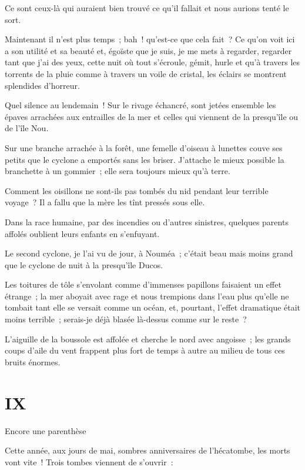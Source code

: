 \documentclass[french,twoside]{book} %
\newcommand\chapteropen{} %
\newcommand\chaptercont{} %
\newcommand\chapterclose{} %
\begin{document}
Ce sont ceux-là qui auraient bien trouvé ce qu’il fallait et nous aurions tenté le sort.\par
Maintenant il n’est plus temps ; bah ! qu’est-ce que cela fait ? Ce qu’on voit ici a son utilité et sa beauté et, égoïste que je suis, je me mets à regarder, regarder tant que j’ai des yeux, cette nuit où tout s’écroule, gémit, hurle et qu’à travers les torrents de la pluie comme à travers un  voile de cristal, les éclairs se montrent splendides d’horreur.\par
Quel silence au lendemain ! Sur le rivage échancré, sont jetées ensemble les épaves arrachées aux entrailles de la mer et celles qui viennent de la presqu’île ou de l’île Nou.\par
Sur une branche arrachée à la forêt, une femelle d’oiseau à lunettes couve ses petits que le cyclone a emportés sans les briser. J’attache le mieux possible la branchette à un gommier ; elle sera toujours mieux qu’à terre.\par
Comment les oisillons ne sont-ils pas tombés du nid pendant leur terrible voyage ? Il a fallu que la mère les tînt pressés sous elle.\par
Dans la race humaine, par des incendies ou d’autres sinistres, quelques parents affolés oublient leurs enfants en s’enfuyant.\par
Le second cyclone, je l’ai vu de jour, à Nouméa ; c’était beau mais moins grand que le cyclone de nuit à la presqu’île Ducos.\par
Les toitures de tôle s’envolant comme d’immenses papillons faisaient un effet étrange ; la mer aboyait avec rage et nous trempions dans l’eau plus qu’elle ne tombait tant elle se versait comme un océan, et, pourtant, l’effet dramatique était moins terrible ; serais-je déjà blasée là-dessus comme sur le reste ?\par
 L’aiguille de la boussole est affolée et cherche le nord avec angoisse ; les grands coups d’aile du vent frappent plus fort de temps à autre au milieu de tous ces bruits énormes.
\chapterclose


\chapteropen
 \chapter[{IX}]{IX}
\label{p2.9}
\begin{center}Encore une parenthèse\end{center}

\chaptercont
\noindent Cette année, aux jours de mai, sombres anniversaires de l’hécatombe, les morts vont vite ! Trois tombes viennent de s’ouvrir :\par
\end{document}
